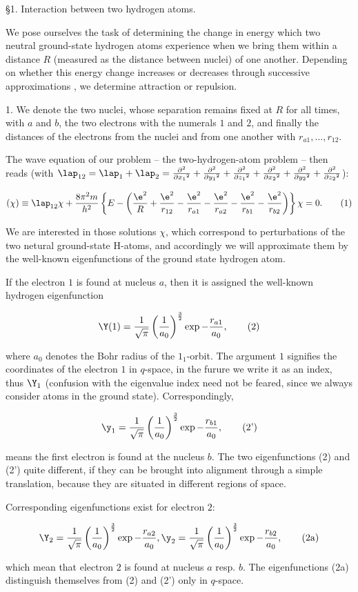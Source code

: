 \documentclass{article}
\newcommand{\nequ}[2]{
\begin{align*}
#1
\tag{#2}
\end{align*}
}
\begin{document}
§1. Interaction between two hydrogen atoms.

We pose ourselves the task of determining the change in energy which two neutral ground-state hydrogen atoms experience when we bring them within a distance $R$ (measured as the distance between nuclei) of one another. Depending on whether this energy change increases or decreases through successive approximations , we determine attraction or repulsion.

1. We denote the two nuclei, whose separation remains fixed at $R$ for all times, with $a$ and $b$, the two electrons with the numerals $1$ and $2$, and finally the distances of the electrons from the nuclei and from one another with $r_{a1},...,r_{12}$.

The wave equation of our problem -- the two-hydrogen-atom problem -- then reads (with $\lap_{12} = \lap_1 + \lap_2 = \frac{\partial^2}{\partial {x_1}^2} + \frac{\partial^2}{\partial {y_1}^2} + \frac{\partial^2}{\partial {z_1}^2} + \frac{\partial^2}{\partial {x_2}^2} + \frac{\partial^2}{\partial {y_2}^2} + \frac{\partial^2}{\partial {z_2}^2}$):
\nequ{
(\chi) \equiv \lap_{12}\chi + \frac{8\pi^2 m}{h^2}\left\{
E - \left(\frac{\e^2}{R} + \frac{\e^2}{r_{12}} - \frac{\e^2}{r_{a1}} - \frac{\e^2}{r_{a2}} - \frac{\e^2}{r_{b1}} - \frac{\e^2}{r_{b2}}
\right)\right\}\chi =
0.}{1}

We are interested in those solutions $\chi$, which correspond to perturbations of the two netural ground-state H-atoms, and accordingly we will approximate them by the well-known eigenfunctions of the ground state hydrogen atom.

If the electron $1$ is found at nucleus $a$, then it is assigned the well-known hydrogen eigenfunction
\nequ{
\Y(1) = \frac{1}{\sqrt{\pi}}\left(\frac{1}{a_0}\right)^\frac{3}{2}\exp{-\frac{r_{a1}}{a_0}},
}{2}
where $a_0$ denotes the Bohr radius of the $1_1$-orbit. The argument $1$ signifies the coordinates of the electron $1$ in $q$-space, in the furure we write it as an index, thus $\Y_1$ (confusion with the eigenvalue index need not be feared, since we always consider atoms in the ground state). Correspondingly,
\nequ{
\y_1 = \frac{1}{\sqrt{\pi}}\left(\frac{1}{a_0}\right)^\frac{3}{2}\exp{-\frac{r_{b1}}{a_0}},
}{2'}
means the first electron is found at the nucleus $b$. The two eigenfunctions (2) and (2') quite different, if they can be brought into alignment through a simple translation, because they are situated in different regions of space.

Corresponding eigenfunctions exist for electron $2$:
\nequ{
\Y_2 = \frac{1}{\sqrt{\pi}}\left(\frac{1}{a_0}\right)^\frac{3}{2}\exp{-\frac{r_{a2}}{a_0}},
\y_2 = \frac{1}{\sqrt{\pi}}\left(\frac{1}{a_0}\right)^\frac{3}{2}\exp{-\frac{r_{b2}}{a_0}},
}{2a}
which mean that electron $2$ is found at nucleus $a$ resp. $b$. The eigenfunctions (2a) distinguish themselves from (2) and (2') only in $q$-space.
\end{document}
